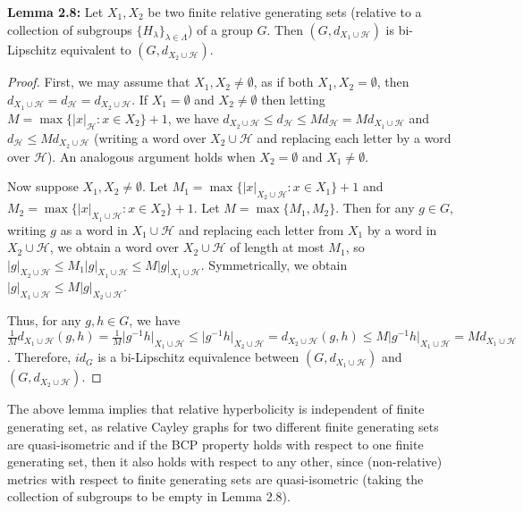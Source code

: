 \documentclass[12pt]{article}
\newcommand{\vs}{\vskip10pt}
\begin{document}
	\vs 
	
	\textbf{Lemma 2.8: } Let $X_1, X_2$ be two finite relative generating sets (relative to a collection of subgroups $\{H_{\lambda}\}_{\lambda \in \Lambda}$) of a group $G$. Then $(G, d_{X_1 \cup \mathcal{H}})$ is bi-Lipschitz equivalent to $(G, d_{X_2 \cup \mathcal{H}})$. 
	
	\begin{proof}
		
		First, we may assume that $X_1, X_2 \neq \emptyset$, as if both $X_1, X_2 = \emptyset$, then $d_{X_1 \cup \mathcal{H}} = d_{\mathcal{H}} = d_{X_2 \cup \mathcal{H}}$. If $X_1 = \emptyset$ and $X_2 \neq \emptyset$ then letting $M = \max \{\vert x \vert_{\mathcal{H}}: x \in X_2\} + 1$, we have $d_{X_2 \cup \mathcal{H}} \leq d_{\mathcal{H}} \leq M d_{\mathcal{H}}   = M d_{X_1 \cup \mathcal{H}}$ and $d_{\mathcal{H}} \leq M d_{X_2 \cup \mathcal{H}}$ (writing a word over $X_2 \cup \mathcal{H}$ and replacing each letter by a word over $\mathcal{H}$). An analogous argument holds when $X_2 = \emptyset$ and $X_1 \neq \emptyset$. 
		
		\vs
		
		Now suppose $X_1, X_2 \neq \emptyset$. Let $M_1 = \max \{\vert x \vert_{X_2 \cup \mathcal{H}} : x \in X_1\} + 1$ and $M_2  = \max \{\vert x \vert_{X_1 \cup \mathcal{H}}: x \in X_2\} + 1$. Let $M = \max \{M_1, M_2\}$. Then for any $g \in G$, writing $g$ as a word in $X_1 \cup \mathcal{H}$ and replacing each letter from $X_1$ by a word in $X_2 \cup \mathcal{H}$, we obtain a word over $X_2 \cup \mathcal{H}$ of length at most $M_1$, so $\vert g \vert_{X_2 \cup \mathcal{H}} \leq M_1 \vert g \vert_{X_1 \cup \mathcal{H}} \leq M \vert g \vert_{X_1 \cup \mathcal{H}}$. Symmetrically, we obtain $\vert g \vert_{X_1 \cup \mathcal{H}} \leq M \vert g \vert_{X_2 \cup \mathcal{H}}$.
		
		\vs
		
		 Thus, for any $g, h \in G$, we have $\frac{1}{M} d_{X_1 \cup \mathcal{H}}(g,h) = \frac{1}{M} \vert g^{-1}h \vert_{X_1 \cup \mathcal{H}} \leq \vert g^{-1}h \vert_{X_2 \cup \mathcal{H}} = d_{X_2 \cup \mathcal{H}}(g,h) \leq M \vert g^{-1}h \vert_{X_1 \cup \mathcal{H}} = M d_{X_1 \cup \mathcal{H}}$. Therefore, $id_G$ is a bi-Lipschitz equivalence between $(G, d_{X_1 \cup \mathcal{H}})$ and $(G, d_{X_2 \cup \mathcal{H}})$. 
		
	\end{proof}

	\vs 
	
	The above lemma implies that relative hyperbolicity is independent of finite generating set, as relative Cayley graphs for two different finite generating sets are quasi-isometric and if the BCP property holds with respect to one finite generating set, then it also holds with respect to any other, since (non-relative) metrics with respect to finite generating sets are quasi-isometric (taking the collection of subgroups to be empty in Lemma 2.8).
	
\end{document}

